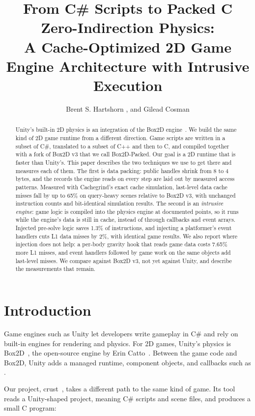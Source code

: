 \documentclass[11pt]{article}
\title{From C\# Scripts to Packed C Zero-Indirection Physics: \\
A Cache-Optimized 2D Game Engine Architecture with Intrusive Execution}
\author{Brent S. Hartshorn \orcidlink{0009-0004-2853-655X}, and Gilead Cosman}
\newcommand{\code}[1]{\texttt{\detokenize{#1}}}
\begin{document}
\maketitle

\begin{abstract}
Unity's built-in 2D physics is an integration of the Box2D engine~\cite{unity_physics}. We build the
same kind of 2D game runtime from a different direction. Game scripts are written in a subset of
C\#, translated to a subset of C++ and then to C, and compiled together with a fork of Box2D v3 that
we call Box2D-Packed. Our goal is a 2D runtime that is faster than Unity's. This paper describes the
two techniques we use to get there and measures each of them. The first is data packing: public
handles shrink from 8 to 4 bytes, and the records the engine reads on every step are laid out by
measured access patterns. Measured with Cachegrind's exact cache simulation, last-level data cache
misses fall by up to 65\% on query-heavy scenes relative to Box2D v3, with unchanged instruction
counts and bit-identical simulation results. The second is an \emph{intrusive engine}: game logic
is compiled into the physics engine at documented points, so it runs while the engine's data is
still in cache, instead of through callbacks and event arrays. Injected pre-solve logic saves
1.3\% of instructions, and injecting a platformer's event handlers cuts L1 data misses by 2\%, with
identical game results. We also report where injection does not help: a per-body gravity hook that
reads game data costs 7.65\% more L1 misses, and event handlers followed by game work on the same
objects add last-level misses. We compare against Box2D v3, not yet against Unity, and describe the
measurements that remain.
\end{abstract}

\section{Introduction}

Game engines such as Unity let developers write gameplay in C\# and rely on built-in engines for
rendering and physics. For 2D games, Unity's physics is Box2D~\cite{unity_physics}, the open-source
engine by Erin Catto~\cite{catto_box2d}. Between the game code and Box2D, Unity adds a managed
runtime, component objects, and callbacks such as \code{OnCollisionEnter2D}.

Our project, crust~\cite{crust}, takes a different path to the same kind of game. Its
\code{unity_pack} tool reads a Unity-shaped project, meaning C\# scripts and \code{.unity} scene
files, and produces a small C program:
\end{document}

